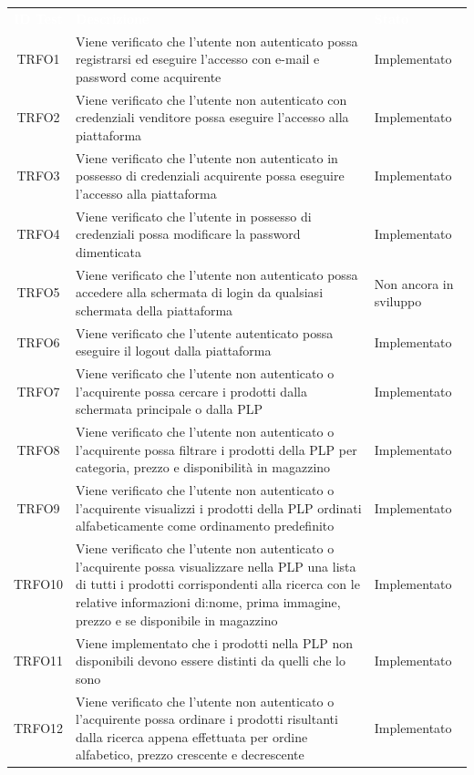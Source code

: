 \begin{longtable}{|c| C{10cm} |C{3cm}|}
	\textcolor{white}{\textbf{ID Test}}&
	\textcolor{white}{\textbf{Descrizione}}&
	\textcolor{white}{\textbf{Stato}}\label{tab:TestSistema1}\\
	TRFO1 & Viene verificato che l'utente non autenticato possa registrarsi ed eseguire l'accesso  con e-mail e password come acquirente & Implementato\\ \hline
	TRFO2 & Viene verificato che l'utente non autenticato con credenziali venditore possa eseguire l'accesso alla piattaforma & Implementato\\ \hline
	TRFO3 & Viene verificato che l'utente non autenticato in possesso di credenziali acquirente possa eseguire l'accesso alla piattaforma & Implementato \\ \hline
	TRFO4 & Viene verificato che l'utente in possesso di credenziali possa modificare la password dimenticata & Implementato\\ \hline
	TRFO5 & Viene verificato che l'utente non autenticato possa accedere alla schermata di login da qualsiasi schermata della piattaforma & Non ancora in sviluppo\\ \hline
	TRFO6 & Viene verificato che l'utente autenticato possa eseguire il logout dalla piattaforma & Implementato\\ \hline
	TRFO7 & Viene verificato che l'utente non autenticato o l'acquirente possa cercare i prodotti dalla schermata principale o dalla PLP & Implementato\\ \hline
	TRFO8 & Viene verificato che l'utente non autenticato o l'acquirente possa filtrare i prodotti della PLP per categoria, prezzo e disponibilità in magazzino & Implementato\\ \hline
	TRFO9 & Viene verificato che l'utente non autenticato o l'acquirente visualizzi i prodotti della PLP ordinati alfabeticamente come ordinamento predefinito & Implementato\\ \hline
	TRFO10 & Viene verificato che l'utente non autenticato o l'acquirente possa visualizzare nella PLP una lista di tutti i prodotti corrispondenti alla ricerca con le relative informazioni di:nome, prima immagine, prezzo e se disponibile in magazzino & Implementato \\ \hline
	TRFO11 & Viene implementato che i prodotti nella PLP non disponibili devono essere distinti da quelli che lo sono & Implementato \\ \hline
	TRFO12 & Viene verificato che l'utente non autenticato o l'acquirente possa ordinare i prodotti risultanti dalla ricerca appena effettuata per ordine alfabetico, prezzo crescente e decrescente & Implementato \\ \hline

\end{longtable}

